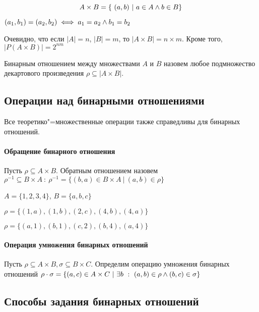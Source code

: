 \begin{equation*}
    A \times B = \{ ~(a, b) ~|~ a \in A \wedge b \in B\}
\end{equation*}

$(a_1, b_1) = (a_2, b_2) \iff a_1 = a_2 \wedge b_1 = b_2$

Очевидно, что если $|A| = n$, $|B| = m$, то $|A\times B| = n \times m$. 
Кроме того, $|P(A\times B)| = 2^{nm}$

Бинарным отношением между множествами $A$ и $B$ назовем любое подмножество
декартового произведения $\rho \subseteq |A \times B|$.

\subsection{Операции над бинарными отношениями}

Все теоретико"=множественные операции также справедливы для бинарных отношений.

\paragraph{Обращение бинарного отношения}

Пусть $\rho \subseteq A \times B$. Обратным отношением назовем 
$\rho^{-1} \subseteq B \times A~:~ \rho^{-1} = \{(b, a) \in B \times A ~|~ (a, b) \in \rho \}$

\begin{example}
    $A = \{1, 2, 3, 4\}$, $B = \{a, b , c\}$
    
    $\rho = \{(1, a), (1, b), (2, c), (4, b), (4, a)\}$
    
    $\rho = \{(a, 1), (b, 1), (c, 2), (b, 4), (a, 4)\}$


\end{example}

\paragraph{Операция умножения бинарных отношений}

Пусть $\rho \subseteq A \times B, \sigma \subseteq B \times C$. 
Определим операцию умножения бинарных отношений $\rho \cdot \sigma = 
\{(a, c) \in A \times C ~|~ \exists b ~:~ (a, b) \in \rho \wedge (b, c) \in \sigma\}$

\subsection{Способы задания бинарных отношений}

